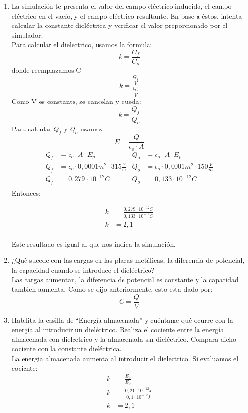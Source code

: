 \documentclass[12pt]{report}
\begin{document}
\begin{enumerate}
\begin{enumerate}
        \item La simulación te presenta el valor del campo eléctrico inducido, el campo eléctrico en el vacío, y el campo eléctrico resultante. En base a éstos, intenta calcular la constante dieléctrica y verificar el valor proporcionado por el simulador.\\[6pt]
        Para calcular el dielectrico, usamos la formula:
        \[k = \frac{C_f}{C_o}\] donde reemplazamos C
        \[k = \frac{\frac{Q_f}{V}}{\frac{Q_o}{V}}\] Como V es constante, se cancelan y queda:
        \[k = \frac{Q_f}{Q_o}\] Para calcular $Q_f$ y $Q_o$ usamos:
        \[E = \frac{Q}{\epsilon_o \cdot A}\]
        \begin{align*}
          Q_f&= \epsilon_o \cdot A \cdot E_p                           & Q_o&=\epsilon_o \cdot A \cdot E_p\\[6pt]
          Q_f&= \epsilon_o \cdot 0,0001 m^2 \cdot 315 \frac{V}{m}      &Q_o&= \epsilon_o \cdot 0,0001 m^2 \cdot 150 \frac{V}{m}\\[6pt]
          Q_f&= 0,279 \cdot 10^{-12} C                                  &Q_o&= 0,133 \cdot 10^{-12} C\\[6pt]
        \end{align*}
        Entonces:

        \begin{align*}
          k&= \frac{0,279 \cdot 10^{-12} C }{0,133 \cdot 10^{-12} C}\\[6pt]
          k&= 2,1\\[6pt]
        \end{align*}

        Este resultado es igual al que nos indica la simulación.

        \item ¿Qué sucede con las cargas en las placas metálicas, la diferencia de potencial, la capacidad cuando se introduce el dieléctrico?\\[6pt]
        Las cargas aumentan, la diferencia de potencial es constante y la capacidad tambien aumenta. Como se dijo anteriormente, esto esta dado por:
        \[C = \frac{Q}{V}\]

        \item Habilita la casilla de “Energía almacenada” y cuéntame qué ocurre con la energía al introducir un dieléctrico. Realiza el cociente entre la energía almacenada con dieléctrico y la almacenada sin dieléctrico. Compara dicho cociente con la constante dieléctrica.\\[6pt]
        La energia almacenada aumenta al introducir el dielectrico. Si evaluamos el cociente:
        \begin{align*}
          k &= \frac{E_f}{E_o}\\[6pt]
          k &= \frac{0,21 \cdot 10^{-12} J}{0,1 \cdot 10^{-12} J}\\[6pt]
          k &= 2,1
        \end{align*}


\end{enumerate}
\end{enumerate}
\end{document}
